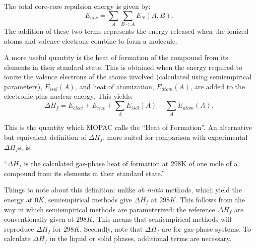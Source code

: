 \documentclass[a4paper]{book}
\begin{document}
The total core-core repulsion energy is given by:
$$
   E_{nuc} = \sum_A\sum_{B<A}E_N(A,B).
$$
 The addition of these two terms represents the energy
released when the ionized atoms and valence electrons
combine to form a molecule.

 A more useful quantity is the
heat of formation of the compound from its elements in their
standard state. This is obtained when the energy required
to ionize the valence electrons of the atoms involved
(calculated using semiempirical parameters), $E_{isol}(A)$, and
heat of atomization, $E_{atom}(A)$, are added to the electronic
plus nuclear energy. This yields:
$$
\Delta H_f = E_{elect} + E_{nuc} + \sum_AE_{isol}(A) +\sum_AE_{atom}(A).
$$

This is the quantity which MOPAC calls the ``Heat of Formation''.
An alternative but equivalent definition of $\Delta H_f$, more
suited for comparison with experimental $\Delta H_f$s, is:

``$\Delta H_f$ is the calculated gas-phase heat of formation at 298K
 of one mole of a compound from its elements in their standard state.''

Things to note about this definition:  unlike {\em ab initio} methods, which
yield the energy at $0K$, semiempirical methods give $\Delta H_f $
at $298K$.  This follows from the way in which semiempirical methods
are parameterized: the reference $\Delta H_f $ are conventionally given at
$298K$.  This means that  semiempirical methods will reproduce $\Delta H_f$
for $298K$.  Secondly, note that $\Delta H_f $ are for gas-phase systems.
To calculate $\Delta H_f $ in the liquid or solid phases, additional terms are
necessary.
\end{document}
